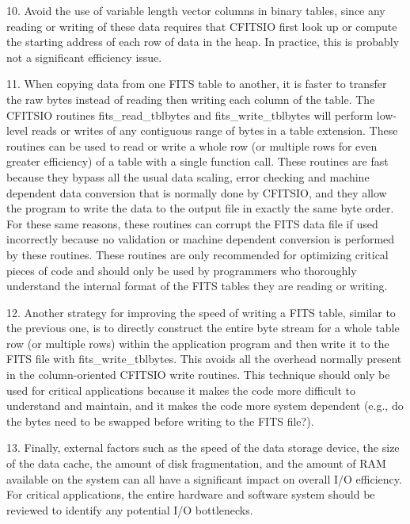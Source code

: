 \documentclass[11pt]{book}
\begin{document}
10. Avoid the use of variable length vector columns in binary tables,
since any reading or writing of these data requires that CFITSIO first
look up or compute the starting address of each row of data in the
heap.  In practice, this is probably not a significant efficiency issue.

11. When copying data from one FITS table to another, it is faster to
transfer the raw bytes instead of reading then writing each column of
the table.  The CFITSIO routines fits\_read\_tblbytes and
fits\_write\_tblbytes will perform low-level reads or writes of any
contiguous range of bytes in a table extension.  These routines can be
used to read or write a whole row (or multiple rows  for even greater
efficiency) of a table with a single function call.   These routines
are fast because they bypass all the usual data scaling, error checking
and machine dependent data conversion that is normally done by CFITSIO,
and they allow the program to write the data to the output file in
exactly the same byte order.  For these same reasons, these routines
can corrupt the FITS data file if used incorrectly because no
validation or machine dependent conversion is performed by these
routines.  These routines are only recommended for optimizing critical
pieces of code and should only be used by programmers who thoroughly
understand the internal format of the FITS tables they are reading or
writing.

12. Another strategy for improving the speed of writing a FITS table,
similar to the previous one, is to directly construct the entire byte
stream for a whole table row (or multiple rows) within the application
program and then write it to the FITS file with
fits\_write\_tblbytes.  This avoids all the overhead normally present
in the column-oriented CFITSIO write routines.  This technique should
only be used for critical applications because it makes the code more
difficult to understand and maintain, and it makes the code more system
dependent (e.g., do the bytes need to be swapped before writing to the
FITS file?).

13.  Finally, external factors such as the speed of the data storage device,
the size of the data cache, the amount of disk fragmentation, and the amount of
RAM available on the system can all have a significant impact on
overall I/O efficiency.  For critical applications, the entire hardware
and software system should be reviewed to identify any
potential I/O bottlenecks.


\appendix
\end{document}

